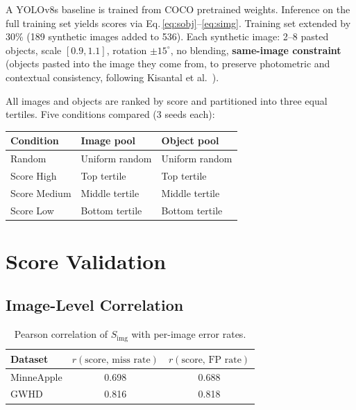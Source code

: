 \documentclass[10pt, a4paper]{article}
\begin{document}
A YOLOv8s baseline is trained from COCO pretrained weights.
Inference on the full training set yields scores via Eq.\,\eqref{eq:sobj}--\eqref{eq:simg}.
Training set extended by 30\% (189 synthetic images added to 536).
Each synthetic image: 2--8 pasted objects, scale $[0.9,1.1]$,
rotation $\pm15^\circ$, no blending, \textbf{same-image constraint}
(objects pasted into the image they come from, to preserve photometric
and contextual consistency, following Kisantal et al.\ \cite{kisantal2019}).

All images and objects are ranked by score and partitioned into three
equal tertiles. Five conditions compared (3 seeds each):

\begin{center}
\small
\begin{tabular}{lll}
\toprule
\textbf{Condition} & \textbf{Image pool} & \textbf{Object pool} \\
\midrule
Random        & Uniform random     & Uniform random \\
Score High    & Top tertile        & Top tertile \\
Score Medium  & Middle tertile     & Middle tertile \\
Score Low     & Bottom tertile     & Bottom tertile \\
\bottomrule
\end{tabular}
\end{center}

\section{Score Validation}

\subsection{Image-Level Correlation}

\begin{table}[H]
\centering
\small
\caption{Pearson correlation of $S_{\text{img}}$ with per-image error rates.}
\begin{tabular}{lcc}
\toprule
\textbf{Dataset} & $r(\text{score, miss rate})$ & $r(\text{score, FP rate})$ \\
\midrule
MinneApple & 0.698 & 0.688 \\
GWHD       & 0.816 & 0.818 \\
\bottomrule
\end{tabular}
\end{table}
\end{document}
